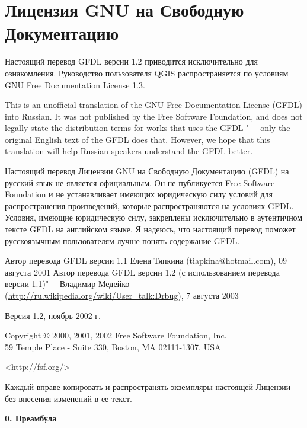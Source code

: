 \chapter{Лицензия GNU на Свободную Документацию}\label{label_fdl_ru}

Настоящий перевод GFDL версии 1.2 приводится исключительно для
ознакомления. Руководство пользователя QGIS распространяется по условиям
GNU Free Documentation License 1.3.

\bigskip

This is an unofficial translation of the GNU Free Documentation License
(GFDL) into Russian. It was not published by the Free Software
Foundation, and does not legally state the distribution terms for works
that uses the GFDL "--- only the original English text of the GFDL does
that. However, we hope that this translation will help Russian speakers
understand the GFDL better.

Настоящий перевод Лицензии GNU на Свободную Документацию (GFDL) на
русский язык не является официальным. Он не публикуется Free Software
Foundation и не устанавливает имеющих юридическую силу условий для
распространения произведений, которые распространяются на условиях GFDL.
Условия, имеющие юридическую силу, закреплены исключительно в аутентичном
тексте GFDL на английском языке. Я надеюсь, что настоящий перевод поможет
русскоязычным пользователям лучше понять содержание GFDL.

Автор перевода GFDL версии 1.1 Елена Тяпкина (tiapkina@hotmail.com),
09 августа 2001
Автор перевода GFDL версии 1.2 (с использованием перевода версии 1.1)"---
Владимир Медейко (\url{http://ru.wikipedia.org/wiki/User_talk:Drbug}),
7 августа 2003

 \begin{center}

       Версия 1.2, ноябрь 2002 г.


 Copyright \copyright{} 2000, 2001, 2002 Free Software Foundation, Inc.\\
 59 Temple Place - Suite 330, Boston, MA 02111-1307, USA

 \bigskip

     <http://fsf.org/>

 \bigskip

 Каждый вправе копировать и распространять экземпляры настоящей
 Лицензии без внесения изменений в ее текст.
\end{center}


\begin{center}
{\bf\large 0. Преамбула}
\end{center}

